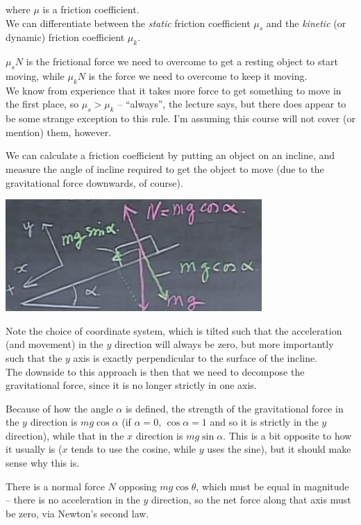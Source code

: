 \documentclass[8.01x]{subfiles}
\begin{document}
where $\mu$ is a friction coefficient.\\
We can differentiate between the \emph{static} friction coefficient $\mu_s$ and the \emph{kinetic} (or dynamic) friction coefficient $\mu_k$.

$\mu_s N$ is the frictional force we need to overcome to get a resting object to start moving, while $\mu_k N$ is the force we need to overcome to keep it moving.\\
We know from experience that it takes more force to get something to move in the first place, so $\mu_s > \mu_k$ -- ``always'', the lecture says, but there does appear to be some strange exception to this rule. I'm assuming this course will not cover (or mention) them, however.

We can calculate a friction coefficient by putting an object on an incline, and measure the angle of incline required to get the object to move (due to the gravitational force downwards, of course).

\begin{center}
\includegraphics[scale=0.8]{Graphics/lec8_friction_incline}
\end{center}

Note the choice of coordinate system, which is tilted such that the acceleration (and movement) in the $y$ direction will always be zero, but more importantly such that the $y$ axis is exactly perpendicular to the surface of the incline.\\
The downside to this approach is then that we need to decompose the gravitational force, since it is no longer strictly in one axis.

Because of how the angle $\alpha$ is defined, the strength of the gravitational force in the $y$ direction is $m g \cos \alpha$ (if $\alpha = 0$, $\cos \alpha = 1$ and so it is strictly in the $y$ direction), while that in the $x$ direction is $m g \sin \alpha$. This is a bit opposite to how it usually is ($x$ tends to use the cosine, while $y$ uses the sine), but it should make sense why this is.

There is a normal force $N$ opposing $m g \cos \theta$, which must be equal in magnitude -- there is no acceleration in the $y$ direction, so the net force along that axis must be zero, via Newton's second law.
\end{document}
